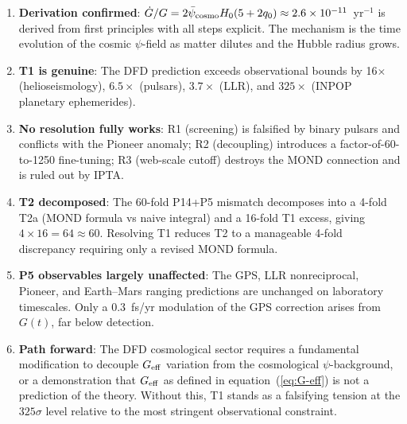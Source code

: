 \documentclass[aps,prd,twocolumn,superscriptaddress,nofootinbib,longbibliography]{revtex4-2}
\newcommand{\psibar}{\bar{\psi}}
\newcommand{\ee}[1]{\times 10^{#1}}
\begin{document}
\begin{enumerate}
\item \textbf{Derivation confirmed}: $\dot{G}/G = 2\psibar_{\rm cosmo}H_0(5+2q_0)
  \approx 2.6\ee{-11}$~yr$^{-1}$ is derived from first principles with all
  steps explicit.  The mechanism is the time evolution of the cosmic $\psi$-field
  as matter dilutes and the Hubble radius grows.
\item \textbf{T1 is genuine}: The DFD prediction exceeds observational bounds
  by 16$\times$ (helioseismology), $6.5\times$ (pulsars), $3.7\times$ (LLR),
  and $325\times$ (INPOP planetary ephemerides).
\item \textbf{No resolution fully works}: R1 (screening) is falsified by
  binary pulsars and conflicts with the Pioneer anomaly; R2 (decoupling)
  introduces a factor-of-60-to-1250 fine-tuning; R3 (web-scale cutoff)
  destroys the MOND connection and is ruled out by IPTA.
\item \textbf{T2 decomposed}: The 60-fold P14+P5 mismatch decomposes into
  a 4-fold T2a (MOND formula vs naive integral) and a 16-fold T1 excess,
  giving $4\times 16 = 64 \approx 60$.  Resolving T1 reduces T2 to a
  manageable 4-fold discrepancy requiring only a revised MOND formula.
\item \textbf{P5 observables largely unaffected}: The GPS, LLR nonreciprocal,
  Pioneer, and Earth--Mars ranging predictions are unchanged on laboratory
  timescales.  Only a 0.3~fs/yr modulation of the GPS correction arises from
  $G(t)$, far below detection.
\item \textbf{Path forward}: The DFD cosmological sector requires a fundamental
  modification to decouple $G_{\rm eff}$ variation from the cosmological
  $\psi$-background, or a demonstration that $G_{\rm eff}$ as defined in
  equation~(\ref{eq:G-eff}) is not a prediction of the theory.  Without this,
  T1 stands as a falsifying tension at the $325\sigma$ level relative to the
  most stringent observational constraint.
\end{enumerate}
\end{document}
